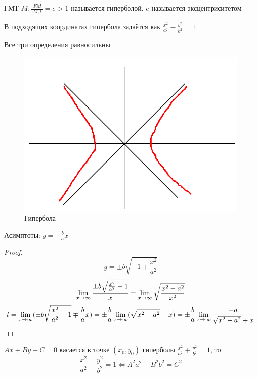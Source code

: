 \begin{definition}
    ГМТ $ M : \frac{FM}{|M, l|} = e > 1 $ называется гиперболой. $ e $ называется эксцентриситетом
\end{definition}

\begin{definition}
    В подходящих координатах гипербола задаётся как $ \frac{x^2}{a^2} - \frac{y^2}{b^2} = 1 $
\end{definition}

\begin{theorem}
	Все три определения равносильны
\end{theorem}

\begin{figure}[h]
    \centering
    \includegraphics[scale=0.5]{1}
    \caption{Гипербола}
\end{figure}

\begin{statement}
    Асимптоты: $ y = \pm \frac{b}a x $
\end{statement}

\begin{proof}
    $$ y = \pm b \sqrt{ -1 + \frac{x^2}{a^2}} $$
    $$ \lim\limits_{x\to\infty} \frac{ \pm b \sqrt{\frac{x^2}{a^2} - 1}}x = \lim\limits_{x\to\infty} \sqrt{\frac{x^2 - a^2}{x^2}} $$
    $$ l = \lim\limits_{x\to\infty} (\pm b \sqrt{\frac{x^2}{a^2} - 1} \mp \frac{b}a x) = \pm \frac{b}a \lim\limits_{x\to\infty} (\sqrt{x^2 - a^2} - x) = \pm \frac{b}a \lim\limits_{x\to\infty} \frac{-a}{\sqrt{x^2 - a^2} + x} $$
\end{proof}

\begin{theorem}
    $ Ax + By + C = 0 $ касается в точке $ (x_0, y_0) $ гиперболы $ \frac{x^2}{a^2} + \frac{y^2}{b^2} = 1 $, то
    $$ \frac{x^2}{a^2} - \frac{y^2}{b^2} = 1 \iff A^2a^2 - B^2b^2 = C^2 $$
\end{theorem}

